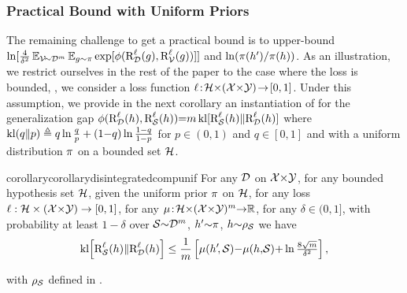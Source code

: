 \documentclass[twoside]{article}
\theoremstyle{plain}
\newif\ifnotappendix
\begin{document}
\subsubsection{Practical Bound with Uniform Priors}
\label{sec:result-practical-uniform}

The remaining challenge to get a practical bound is to upper-bound  $\ln[\frac{4}{\delta^2}\EE_{\Vcal\!{\sim}\Dcal^m}\EE_{g{\sim}\P}\exp[\phi(\RiskLoss_{\Dcal}(g), \RiskLoss_{\Vcal}(g))]]$ and $\ln({\P(h')}/{\P(h)})$.
As an illustration, we restrict ourselves in the rest of the paper to the case where the loss is bounded, \ie, we consider a loss function $\loss \!:\! \Hcal{\times}(\Xcal{\times}\Ycal) \!\to\! [0,1]$. 
Under this assumption, we provide in the next corollary an instantiation of  for the generalization gap $\phi(\RiskLoss_{\Dcal}(h), \RiskLoss_{\Scal}(h)){=}m\kl[\RiskLoss_{\Scal}(h)\|\RiskLoss_{\Dcal}(h)]$ where $\kl(q\|p) \defeq q\ln\frac{q}{p}+(1{-}q)\ln\frac{1{-}q}{1{-}p}$ for $p\in(0,1)$ and $q\in[0,1]$ and with a uniform distribution $\P$ on a bounded set $\Hcal$.
\begin{restatable}{corollary}{corollarydisintegratedcompunif}\label{corollary:disintegrated-comp-unif}
For any $\Dcal$ on $\Xcal{\times}\Ycal$, for any bounded hypothesis set $\Hcal$, given the uniform prior $\P$ on $\Hcal$, for any loss $\loss : \Hcal\times(\Xcal{\times}\Ycal) \to [0,1]$, for any $\comp\!:\! \Hcal{\times}(\Xcal{\times}\Ycal)^m{\to}\R$, for any $\delta\!\in\!(0,1]$, with probability at least $1{-}\delta$ over $\Scal{\sim}\Dcal^m$, $h'{\sim}\P$, $h{\sim}\AQ$ we have
\ifnotappendix%
\begin{align}
\kl\!\LB\RiskLoss_{\Scal}(h)\|\RiskLoss_{\Dcal}(h)\RB\le\frac{\comp(h'\!,\Scal){-}\!\comp(h{,}\Scal){+}\ln\tfrac{8\sqrt{m}}{\delta^2}}{m},\label{eq:disintegrated-comp-seeger}
\end{align}
\else%
\begin{align*}
\kl\!\LB\RiskLoss_{\Scal}(h)\|\RiskLoss_{\Dcal}(h)\RB\le \frac{1}{m}\LB\comp(h'\!,\Scal){-}\!\comp(h{,}\Scal){+}\ln\tfrac{8\sqrt{m}}{\delta^2}\RB,
\end{align*}
\fi
{}
with $\AQ$ defined in .
\end{restatable}
\end{document}
